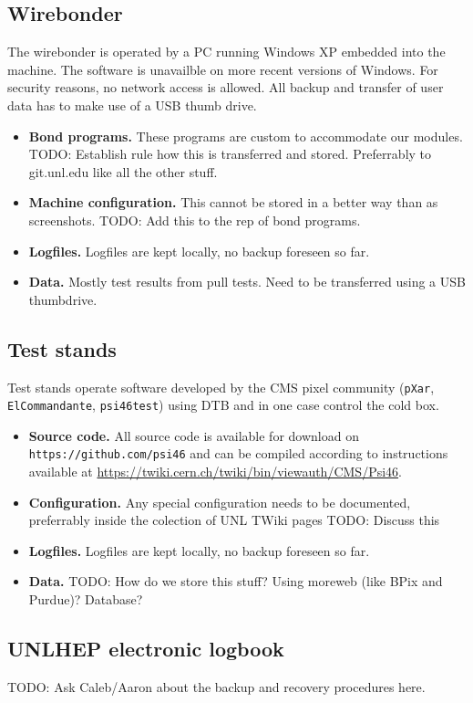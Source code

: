 \documentclass[12pt]{unlsilabsop}
\begin{document}
\subsection{Wirebonder}
The wirebonder is operated by a PC running Windows XP embedded into the machine. The software is unavailble on more recent versions of Windows. For security reasons, no network access is allowed. All backup and transfer of user data has to make use of a USB thumb drive.
\begin{itemize}
    \item \textbf{Bond programs.} These programs are custom to accommodate our modules. TODO: Establish rule how this is transferred and stored. Preferrably to git.unl.edu like all the other stuff.
    \item \textbf{Machine configuration.} This cannot be stored in a better way than as screenshots. TODO: Add this to the rep of bond programs.
    \item \textbf{Logfiles.} Logfiles are kept locally, no backup foreseen so far.
    \item \textbf{Data.} Mostly test results from pull tests. Need to be transferred using a USB thumbdrive.
\end{itemize}

\subsection{Test stands}
Test stands operate software developed by the CMS pixel community (\texttt{pXar}, \texttt{ElCommandante}, \texttt{psi46test}) using DTB and in one case control the cold box.
\begin{itemize}
    \item \textbf{Source code.} All source code is available for download on \texttt{https://github.com/psi46} and can be compiled according to instructions available at \url{https://twiki.cern.ch/twiki/bin/viewauth/CMS/Psi46}.
    \item \textbf{Configuration.} Any special configuration needs to be documented, preferrably inside the colection of UNL TWiki pages TODO: Discuss this
    \item \textbf{Logfiles.} Logfiles are kept locally, no backup foreseen so far.
    \item \textbf{Data.} TODO: How do we store this stuff? Using moreweb (like BPix and Purdue)? Database?
\end{itemize}

\subsection{UNLHEP electronic logbook}
TODO: Ask Caleb/Aaron about the backup and recovery procedures here.
\end{document}
